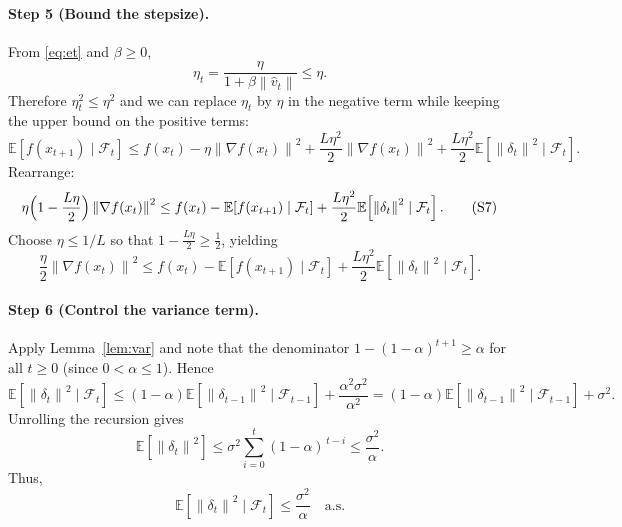 \documentclass{article}
\newcommand{\E}{\mathbb{E}}
\newcommand{\norm}[1]{\left\|#1\right\|}
\newcommand{\grad}{\nabla}
\begin{document}
\paragraph{Step 5 (Bound the stepsize).}
From \eqref{eq:et} and $\beta\ge0$,
\[
    \eta_t = \frac{\eta}{1+\beta\norm{\hat v_t}}
    \le \eta .
\]
Therefore $\eta_t^2\le\eta^2$ and we can replace $\eta_t$ by $\eta$ in the negative term while keeping the upper bound on the positive terms:
\begin{equation}
    \E\!\left[f(x_{t+1})\mid\mathcal{F}_t\right]
    \le f(x_t)-\eta\norm{\grad f(x_t)}^2
        +\frac{L\eta^2}{2}\norm{\grad f(x_t)}^2
        +\frac{L\eta^2}{2}\E\!\left[\norm{\delta_t}^2\mid\mathcal{F}_t\right] .
    \tag{S6}
\end{equation}
Rearrange:
\begin{equation}
    \eta\Bigl(1-\frac{L\eta}{2}\Bigr)\norm{\grad f(x_t)}^2
    \le f(x_t)-\E\!\left[f(x_{t+1})\mid\mathcal{F}_t\right]
        +\frac{L\eta^2}{2}\E\!\left[\norm{\delta_t}^2\mid\mathcal{F}_t\right] .
    \tag{S7}
\end{equation}
Choose $\eta\le 1/L$ so that $1-\frac{L\eta}{2}\ge\frac12$, yielding
\begin{equation}
    \frac{\eta}{2}\norm{\grad f(x_t)}^2
    \le f(x_t)-\E\!\left[f(x_{t+1})\mid\mathcal{F}_t\right]
        +\frac{L\eta^2}{2}\E\!\left[\norm{\delta_t}^2\mid\mathcal{F}_t\right] .
    \tag{S8}
\end{equation}

\paragraph{Step 6 (Control the variance term).}
Apply Lemma~\ref{lem:var} and note that the denominator $1-(1-\alpha)^{t+1}\ge\alpha$ for all $t\ge0$ (since $0<\alpha\le1$). Hence
\[
    \E\!\left[\norm{\delta_t}^2\mid\mathcal{F}_t\right]
    \le (1-\alpha)\E\!\left[\norm{\delta_{t-1}}^2\mid\mathcal{F}_{t-1}\right]
        +\frac{\alpha^2\sigma^2}{\alpha^2}
    = (1-\alpha)\E\!\left[\norm{\delta_{t-1}}^2\mid\mathcal{F}_{t-1}\right]+\sigma^2 .
\]
Unrolling the recursion gives
\[
    \E\!\left[\norm{\delta_t}^2\right]\le \sigma^2\sum_{i=0}^{t}(1-\alpha)^{\,t-i}
    \le \frac{\sigma^2}{\alpha}.
\]
Thus,
\begin{equation}
    \E\!\left[\norm{\delta_t}^2\mid\mathcal{F}_t\right]\le\frac{\sigma^2}{\alpha}\quad\text{a.s.}
    \tag{S9}
\end{equation}
\end{document}
